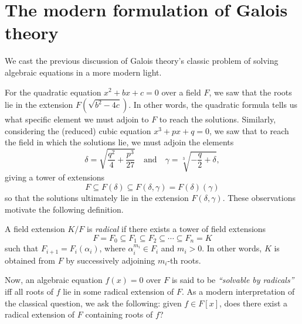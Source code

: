 \section{The modern formulation of Galois theory}

We cast the previous discussion of Galois theory's classic problem of solving algebraic equations in a more modern light.

For the quadratic equation $x^2 + bx + c = 0$ over a field $F$, we saw that the roots lie in the extension $F(\sqrt{b^2 - 4c})$. In other words, the quadratic formula tells us what specific element we must adjoin to $F$ to reach the solutions. Similarly, considering the (reduced) cubic equation $x^3 + px + q = 0$, we saw that to reach the field in which the solutions lie, we must adjoin the elements
\[
    \delta = \sqrt{\frac{q^2}{4} + \frac{p^3}{27}}
    \quad \text{and} \quad
    \gamma = \sqrt[3]{-\frac{q}{2} + \delta},
\]
giving a tower of extensions
\[
    F \subseteq F(\delta) \subseteq F(\delta, \gamma) = F(\delta)(\gamma)
\]
so that the solutions ultimately lie in the extension $F(\delta, \gamma)$. These observations motivate the following definition.

\begin{definition}
    A field extension $K/F$ is \emph{radical} if there exists a tower of field extensions
    \[
        F = F_0 \subseteq F_1 \subseteq F_2 \subseteq \cdots \subseteq F_n = K
    \]
    such that $F_{i + 1} = F_i(\alpha_i)$, where $\alpha_i^{m_i} \in F_i$ and $m_i > 0$. In other words, $K$ is obtained from $F$ by successively adjoining $m_i$-th roots.
\end{definition}

Now, an algebraic equation $f(x) = 0$ over $F$ is said to be \emph{``solvable by radicals''} iff all roots of $f$ lie in some radical extension of $F$. As a modern interpretation of the classical question, we ask the following: given $f \in F[x]$, does there exist a radical extension of $F$ containing roots of $f$?
